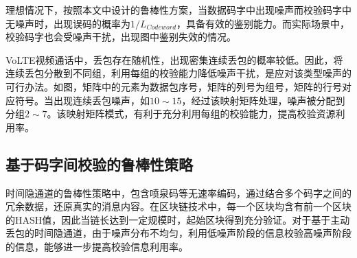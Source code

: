 理想情况下，按照本文中设计的鲁棒性方案，当数据码字中出现噪声而校验码字中无噪声时，出现误码的概率为$1/L_{Codeword}$，具备有效的鉴别能力。而实际场景中，校验码字也会受噪声干扰，出现图中鉴别失效的情况。


VoLTE视频通话中，丢包存在随机性，出现密集连续丢包的概率较低。因此，将连续丢包分散到不同组，利用每组的校验能力降低噪声干扰，是应对该类型噪声的可行办法。如图，矩阵中的元素为数据包序号，矩阵的列号为组号，矩阵的行号对应符号。当出现连续丢包噪声，如$10\sim 15$，经过该映射矩阵处理，噪声被分配到分组$2\sim 7$。该映射矩阵模式，有利于充分利用每组的校验能力，提高校验资源利用率。

\subsection{基于码字间校验的鲁棒性策略}
\label{chap:hash:motivation:robustness}

时间隐通道的鲁棒性策略中，包含喷泉码等无速率编码，通过结合多个码字之间的冗余数据，还原真实的消息内容。在区块链技术中，每一个区块均含有前一个区块的HASH值，因此当链长达到一定规模时，起始区块得到充分验证。对于基于主动丢包的时间隐通道，由于噪声分布不均匀，利用低噪声阶段的信息校验高噪声阶段的信息，能够进一步提高校验信息利用率。


